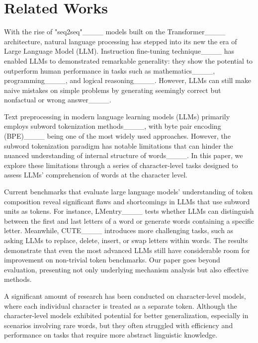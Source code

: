 \section{Related Works}
With the rise of "seq2seq"____ models built on the Transformer____ architecture, natural language processing has stepped into its new the era of Large Language Model (LLM). Instruction fine-tuning technique____ has enabled LLMs to demonstrated remarkable generality: they show the potential to outperform human performance in tasks such as mathematics____, programming____, and logical reasoning____. However, LLMs can still make naive mistakes on simple problems by generating seemingly correct but nonfactual or wrong answer____.

Text preprocessing in modern language learning models (LLMs) primarily employs subword tokenization methods____, with byte pair encoding (BPE)____ being one of the most widely used approaches. However, the subword tokenization paradigm has notable limitations that can hinder the nuanced understanding of internal structure of words____. In this paper, we explore these limitations through a series of character-level tasks designed to assess LLMs' comprehension of words at the character level.

Current benchmarks that evaluate large language models' understanding of token composition reveal significant flaws and shortcomings in LLMs that use subword units as tokens. For instance, LMentry____ tests whether LLMs can distinguish between the first and last letters of a word or generate words containing a specific letter. Meanwhile, CUTE____ introduces more challenging tasks, such as asking LLMs to replace, delete, insert, or swap letters within words. The results demonstrate that even the most advanced LLMs still have considerable room for improvement on non-trivial token benchmarks. Our paper goes beyond evaluation, presenting not only underlying mechanism analysis but also effective methods.

A significant amount of research has been conducted on character-level models, where each individual character is treated as a separate token. Although the character-level models exhibited potential for better generalization, especially in scenarios involving rare words, but they often struggled with efficiency and performance on tasks that require more abstract linguistic knowledge.